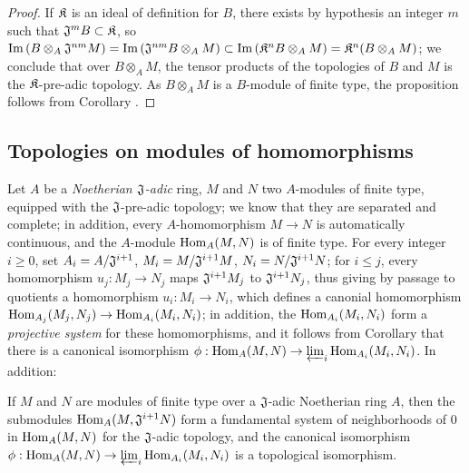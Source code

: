 \begin{proof}
\label{proof-0.7.7.8}
If $\mathfrak{K}$ is an ideal of definition for $B$, there exists by hypothesis an integer $m$ such that $\mathfrak{J}^m B\subset\mathfrak{K}$, so ${\mathop{\mathrm{Im}}\nolimits}\,(B\otimes_A\mathfrak{J}^{nm}M)={\mathop{\mathrm{Im}}\nolimits}\,(\mathfrak{J}^{nm}B\otimes_A M)\subset{\mathop{\mathrm{Im}}\nolimits}\,(\mathfrak{K}^n B\otimes_A M)=\mathfrak{K}^n(B\otimes_A M)$;
we conclude that over $B\otimes_A M$, the tensor products of the topologies of $B$ and $M$ is the $\mathfrak{K}$-pre-adic topology.
As $B\otimes_A M$ is a $B$-module of finite type, the proposition follows from Corollary .
\end{proof}

\subsection{Topologies on modules of homomorphisms}
\label{subsection:topologies-on-hom-modules}

\begin{env}[7.8.1]
\label{0.7.8.1}
Let $A$ be a \emph{Noetherian $\mathfrak{J}$-adic} ring, $M$ and $N$ two $A$-modules of finite type,
equipped with the $\mathfrak{J}$-pre-adic topology; we know  that they are
separated and complete; in addition, every $A$-homomorphism $M\to N$ is automatically continuous, and
the $A$-module ${\mathop{\mathrm{Hom}}\nolimits}_A(M,N)$ is of finite type. For every integer $i\geqslant 0$, set
$A_i=A/\mathfrak{J}^{i+1}$, $M_i=M/\mathfrak{J}^{i+1}M$, $N_i=N/\mathfrak{J}^{i+1}N$; for
$i\leqslant j$, every homomorphism $u_j:M_j\to N_j$ maps $\mathfrak{J}^{i+1}M_j$ to
$\mathfrak{J}^{i+1}N_j$, thus giving by passage to quotients a homomorphism $u_i:M_i\to N_i$, which
defines a canonial homomorphism $\Hom_{A_j}(M_j,N_j)\to\Hom_{A_i}(M_i,N_i)$; in addition, the
${\mathop{\mathrm{Hom}}\nolimits}_{A_i}(M_i,N_i)$ form a \emph{projective system} for these homomorphisms, and it follows from
Corollary  that there is a canonical isomorphism
$\vphi:\Hom_A(M,N)\to\varprojlim_i\Hom_{A_i}(M_i,N_i)$.
In addition:
\end{env}

\begin{prop}[7.8.2]
\label{0.7.8.2}
If $M$ and $N$ are modules of finite type over a $\mathfrak{J}$-adic Noetherian ring $A$, then the
submodules ${\mathop{\mathrm{Hom}}\nolimits}_A(M,\mathfrak{J}^{i+1}N)$ form a fundamental system of neighborhoods of $0$ in
${\mathop{\mathrm{Hom}}\nolimits}_A(M,N)$ for the $\mathfrak{J}$-adic topology, and the canonical isomorphism
$\vphi:\Hom_A(M,N)\to\varprojlim_i\Hom_{A_i}(M_i,N_i)$ is a topological isomorphism.
\end{prop}


